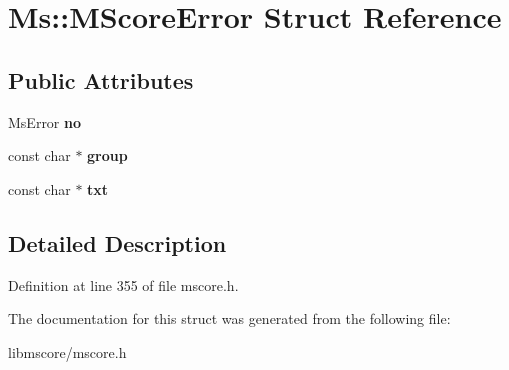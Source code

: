 \hypertarget{struct_ms_1_1_m_score_error}{}\section{Ms\+:\+:M\+Score\+Error Struct Reference}
\label{struct_ms_1_1_m_score_error}
\subsection*{Public Attributes}
\begin{DoxyCompactItemize}
\item 
\mbox{\label{struct_ms_1_1_m_score_error_ac9fda275b3492183ab16fa5f8fecdc3a}} 
Ms\+Error {\bfseries no}
\item 
\mbox{\label{struct_ms_1_1_m_score_error_aa042b4c1b7b000a2dddccc5d1480cc61}} 
const char $\ast$ {\bfseries group}
\item 
\mbox{\label{struct_ms_1_1_m_score_error_a75b4f98356566ba8320d653762afe510}} 
const char $\ast$ {\bfseries txt}
\end{DoxyCompactItemize}


\subsection{Detailed Description}


Definition at line 355 of file mscore.\+h.



The documentation for this struct was generated from the following file\+:\begin{DoxyCompactItemize}
\item 
libmscore/mscore.\+h\end{DoxyCompactItemize}
